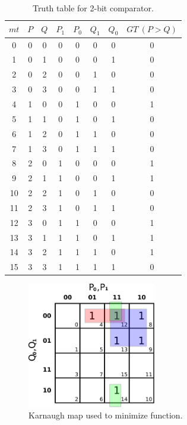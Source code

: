 \documentclass{article}
\begin{document}
\begin{table}[hbtp]
  \label{tab:truth}
  \centering
  \begin{tabular}{c|cc|cccc|c}
    $mt$ & $P$ & $Q$ & $P_1$ & $P_0$ & $Q_1$ & $Q_0$ & $GT~(P > Q)$ \\
    \hline
   0 & 0 & 0 & 0 & 0 & 0 & 0 & 0 \\
   1 & 0 & 1 & 0 & 0 & 0 & 1 & 0 \\
   2 & 0 & 2 & 0 & 0 & 1 & 0 & 0 \\
   3 & 0 & 3 & 0 & 0 & 1 & 1 & 0 \\
   4 & 1 & 0 & 0 & 1 & 0 & 0 & 1 \\
   5 & 1 & 1 & 0 & 1 & 0 & 1 & 0 \\
   6 & 1 & 2 & 0 & 1 & 1 & 0 & 0 \\
   7 & 1 & 3 & 0 & 1 & 1 & 1 & 0 \\
   8 & 2 & 0 & 1 & 0 & 0 & 0 & 1 \\
   9 & 2 & 1 & 1 & 0 & 0 & 1 & 1 \\
  10 & 2 & 2 & 1 & 0 & 1 & 0 & 0 \\
  11 & 2 & 3 & 1 & 0 & 1 & 1 & 0 \\
  12 & 3 & 0 & 1 & 1 & 0 & 0 & 1 \\
  13 & 3 & 1 & 1 & 1 & 0 & 1 & 1 \\
  14 & 3 & 2 & 1 & 1 & 1 & 0 & 1 \\
  15 & 3 & 3 & 1 & 1 & 1 & 1 & 0 \\
  \end{tabular}
  \caption{\label{tab:truth}Truth table for 2-bit comparator.}
\end{table}

\begin{figure}[hbtp]
  \centering
  \includegraphics[width=0.5\textwidth]{k_map}
  \caption{\label{fig:k_map} Karnaugh map used to minimize function.}
\end{figure}
\end{document}
